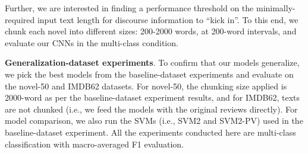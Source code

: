 Further, we are interested in finding a performance threshold on the minimally-required input text length for discourse information to ``kick in''. 
To this end, we chunk each novel into different sizes: 200-2000 words, at 200-word intervals, and evaluate our CNNs in the multi-class condition. 
\medskip

\noindent
\textbf{Generalization-dataset experiments}.
To confirm that our models generalize, we pick the best models from the baseline-dataset experiments and evaluate on the novel-50 and IMDB62 datasets. 
For novel-50, the chunking size applied is 2000-word as per the baseline-dataset experiment results, and for IMDB62, texts are not chunked (i.e., we feed the models with the original reviews directly). 
For model comparison, we also run the SVMs (i.e., SVM2 and SVM2-PV) used in the baseline-dataset experiment.
All the experiments conducted here are multi-class classification with macro-averaged F1 evaluation.
\medskip

\begin{table}[t]
\begin{center}
\caption{Accuracy for pairwise author classification on the novel-9 dataset, using either a dumb baseline, an SVM with and without discourse to replicate F15, or a bigram-character CNN (CNN2) with and without discourse.}
\label{tab-num1:exp1}
\end{center}
\end{table}

